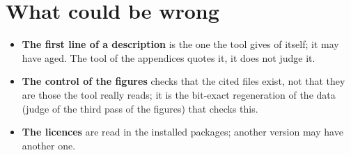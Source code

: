 \section*{What could be wrong}

\begin{faux}
\begin{itemize}
\item \textbf{The first line of a description} is the one the tool gives of itself; it may have aged. The tool of the appendices quotes it, it does not judge it.
\item \textbf{The control of the figures} checks that the cited files exist, not that they are those the tool really reads; it is the bit-exact regeneration of the data (judge of the third pass of the figures) that checks this.
\item \textbf{The licences} are read in the installed packages; another version may have another one.
\end{itemize}
\end{faux}
